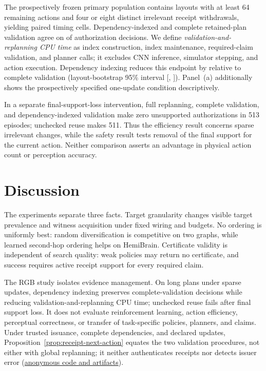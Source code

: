 \documentclass{article}
\begin{document}
The prospectively frozen primary population contains \AmortizedEligible{}
layouts with at least 64 remaining actions and four or eight distinct irrelevant
receipt withdrawals, yielding \AmortizedPairedCells{} paired timing cells.
Dependency-indexed and complete retained-plan validation agree on
\AmortizedAgreement{} of authorization decisions. We define
\emph{validation-and-replanning CPU time} as index construction, index
maintenance, required-claim validation, and planner calls; it excludes CNN
inference, simulator stepping, and action execution. Dependency indexing reduces
this endpoint by \AmortizedReduction{} relative to complete validation (layout-bootstrap 95\% interval
[\AmortizedReductionLow{}, \AmortizedReductionHigh{}]). Panel~(a) additionally
shows the prospectively specified one-update condition descriptively.

In a separate final-support-loss intervention, full replanning, complete
validation, and dependency-indexed validation make zero unsupported
authorizations in 513 episodes; unchecked reuse makes 511. Thus the efficiency
result concerns sparse irrelevant changes, while the safety result tests removal
of the final support for the current action. Neither comparison asserts an
advantage in physical action count or perception accuracy.





\section{Discussion}

The experiments separate three facts. Target granularity changes visible target
prevalence and witness acquisition under fixed wiring and budgets. No ordering is
uniformly best: random diversification is competitive on two graphs, while
learned second-hop ordering helps on HemiBrain. Certificate validity is
independent of search quality: weak policies may return no certificate, and
success requires active receipt support for every required claim.

The RGB study isolates evidence management. On long plans under sparse updates,
dependency indexing preserves complete-validation decisions while reducing
validation-and-replanning CPU time; unchecked reuse fails after final support
loss. It does not evaluate reinforcement learning, action efficiency, perceptual
correctness, or transfer of task-specific policies, planners, and claims.
Under trusted issuance, complete dependencies, and declared updates,
Proposition~\ref{prop:receipt-next-action} equates the two validation
procedures, not either with global replanning; it neither authenticates receipts
nor detects issuer error (\href{https://anonymous.4open.science/r/connectomequest/README.md}{anonymous code and artifacts}).



\clearpage


\end{document}
